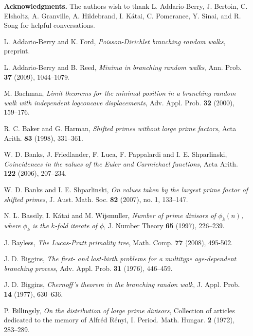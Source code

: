 \documentclass[12pt]{amsart}
\theoremstyle{remark}
\theoremstyle{plain}
\numberwithin{equation}{section}
\renewcommand{\(}{\left(}
\renewcommand{\)}{\right)}
\newcommand{\ms}{\medskip}
\begin{document}

\ms
\noindent
{\bf Acknowledgments.}  The authors wish to thank L.
Addario-Berry, J. Bertoin, C. Elsholtz, A. Granville,
A. Hildebrand, I. K\'atai, C. Pomerance,
Y. Sinai, and R. Song for helpful conversations.



\begin{thebibliography}{BFLSP}

 L. Addario-Berry and K. Ford, {\it Poisson-Dirichlet
branching random walks}, preprint.

 L. Addario-Berry and B. Reed, {\it Minima in branching
  random walks}, Ann. Prob. {\bf 37} (2009), 1044--1079.

 M. Bachman, {\it Limit theorems for the minimal position
  in a branching random walk with independent logconcave
  displacements}, Adv. Appl. Prob. {\bf 32} (2000), 159--176.

 R. C. Baker and G. Harman, {\it Shifted primes without
  large prime factors}, Acta Arith. {\bf 83} (1998), 331--361.

 W. D. Banks, J. Friedlander, F. Luca, F. Pappalardi
and I. E. Shparlinski, {\it Coincidences in the values of the Euler and
Carmichael functions}, Acta Arith. {\bf 122} (2006), 207--234.

  W. D. Banks and I. E. Shparlinski, {\it On values taken
  by the largest prime factor of shifted primes},
 J. Aust. Math. Soc.  {\bf 82}  (2007),  no. 1, 133--147.

 N. L. Bassily, I. K\'atai and M. Wijsmuller,
{\it Number of prime divisors of $\phi_k(n)$, where $\phi_k$ is the
$k$-fold iterate of $\phi$}, J. Number Theory {\bf 65} (1997), 226--239.

 J. Bayless, {\it The Lucas-Pratt primality tree},
Math. Comp.  {\bf 77}  (2008), 495-502.

 J. D. Biggins, {\it The first- and last-birth problems
  for a multitype age-dependent branching process},
  Adv. Appl. Prob. {\bf 31} (1976), 446--459.

 J. D. Biggins, {\it Chernoff's theorem in the branching
randon walk}, J. Appl. Prob. {\bf 14} (1977), 630--636.

 P. Billingsly, {\it
On the distribution of large prime divisors},
Collection of articles dedicated to the memory of Alfr\'ed R\'enyi, I.
Period. Math. Hungar. {\bf 2} (1972), 283--289.


\end{thebibliography}
\end{document}
